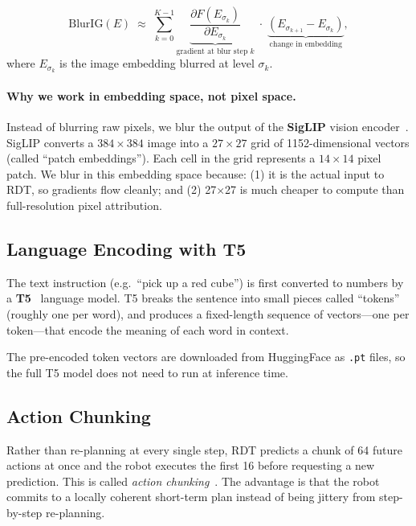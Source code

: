 \documentclass[11pt,a4paper]{article}
\begin{document}
\begin{equation}
    \mathrm{BlurIG}(E)
    \;\approx\;
    \sum_{k=0}^{K-1}
    \underbrace{\frac{\partial F(E_{\sigma_k})}{\partial E_{\sigma_k}}}_{\text{gradient at blur step }k}
    \;\cdot\;
    \underbrace{(E_{\sigma_{k+1}} - E_{\sigma_k})}_{\text{change in embedding}},
    \label{eq:blurig}
\end{equation}
where $E_{\sigma_k}$ is the image embedding blurred at level $\sigma_k$.

\paragraph{Why we work in embedding space, not pixel space.}
Instead of blurring raw pixels, we blur the output of the \textbf{SigLIP}
vision encoder~\cite{Zhai2023SigLIP}. SigLIP converts a $384 \times 384$ image
into a $27 \times 27$ grid of 1152-dimensional vectors (called ``patch
embeddings''). Each cell in the grid represents a $14 \times 14$ pixel patch.
We blur in this embedding space because: (1) it is the actual input to RDT,
so gradients flow cleanly; and (2) 27$\times$27 is much cheaper to compute
than full-resolution pixel attribution.

\subsection{Language Encoding with T5}

The text instruction (e.g.\ ``pick up a red cube'') is first converted to
numbers by a \textbf{T5}~\cite{Raffel2020T5} language model. T5 breaks the
sentence into small pieces called ``tokens'' (roughly one per word), and
produces a fixed-length sequence of vectors---one per token---that encode
the meaning of each word in context.

The pre-encoded token vectors are downloaded from HuggingFace as \texttt{.pt}
files, so the full T5 model does not need to run at inference time.

\subsection{Action Chunking}

Rather than re-planning at every single step, RDT predicts a chunk of 64
future actions at once and the robot executes the first 16 before requesting
a new prediction. This is called \emph{action chunking}~\cite{Zhao2023ACT}.
The advantage is that the robot commits to a locally coherent short-term plan
instead of being jittery from step-by-step re-planning.
\end{document}
